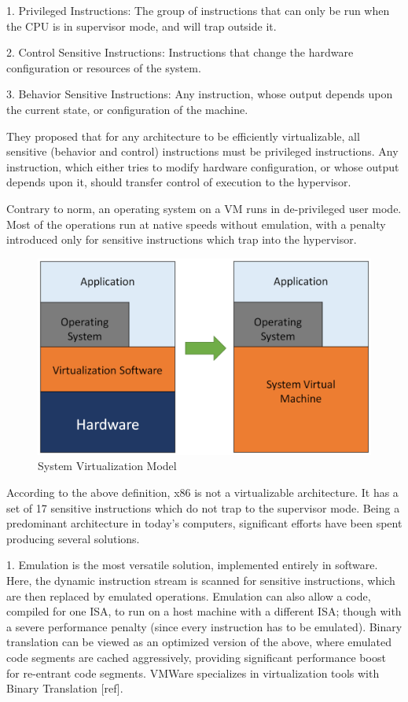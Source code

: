 1. Privileged Instructions: The group of instructions that can only be run when the CPU is in supervisor mode, and will trap outside it. 

2. Control Sensitive Instructions: Instructions that change the hardware configuration or resources of the system. 

3. Behavior Sensitive Instructions: Any instruction, whose output depends upon the current state, or configuration of the machine. 

 
They proposed that for any architecture to be efficiently virtualizable, all sensitive (behavior and control) instructions must be privileged instructions. Any instruction, which either tries to modify hardware configuration, or whose output depends upon it, should transfer control of execution to the hypervisor.

Contrary to norm, an operating system on a VM runs in de-privileged user mode. Most of the operations run at native speeds without emulation, with a penalty introduced only for sensitive instructions which trap into the hypervisor. 

\setlength{\belowcaptionskip}{-10pt}

\begin{figure}[H]
  \centering
  \includegraphics[scale=0.6]{figures/sys_virt.png}
  \caption{System Virtualization Model}
  \label{fig:sys_virt}
\end{figure}

According to the above definition, x86 is not a virtualizable architecture. It has a set of 17 sensitive instructions which do not trap to the supervisor mode. Being a predominant architecture in today’s computers, significant efforts have been spent producing several solutions.  

1. Emulation is the most versatile solution, implemented entirely in software. Here, the dynamic instruction stream is scanned for sensitive instructions, which are then replaced by emulated operations. Emulation can also allow a code, compiled for one ISA, to run on a host machine with a different ISA; though with a severe performance penalty (since every instruction has to be emulated). Binary translation can be viewed as an optimized version of the above, where emulated code segments are cached aggressively, providing significant performance boost for re-entrant code segments. VMWare specializes in virtualization tools with Binary Translation [ref]. 


